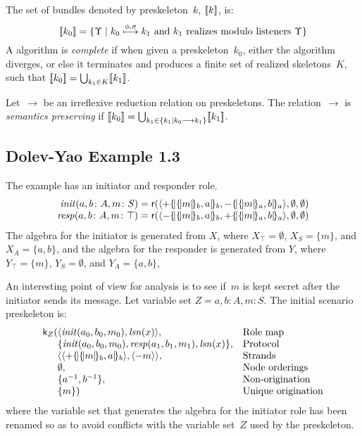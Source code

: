 \documentclass[12pt]{article}
\theoremstyle{definition}
\newcommand{\role}{\mathsf{r}}
\newcommand{\skel}{\mathsf{k}}
\newcommand{\lsn}{\fn{lsn}}
\newcommand{\init}{\fn{init}}
\newcommand{\resp}{\fn{resp}}
\begin{document}
The set of bundles denoted by preskeleton~$k$, $[\![k]\!]$, is:
$$[\![k_0]\!] = \{\Upsilon\mid
\mbox{$k_0\stackrel{\phi,\sigma}{\longmapsto}k_1$ and $k_1$ realizes modulo
  listeners $\Upsilon$}\}$$ A {\cpsa} algorithm is \emph{complete} if
when given a preskeleton~$k_0$, either the algorithm diverges, or else it
terminates and produces a finite set of realized skeletons~$K$, such
that $[\![k_0]\!]=\bigcup_{k_1\in K}[\![k_1]\!]$.

Let~$\longrightarrow$ be an irreflexive reduction relation on
preskeletons.  The relation~$\longrightarrow$ is \emph{semantics
  preserving} if $[\![k_0]\!]=\bigcup_{k_1\in\{k_1\mid
  k_0\longrightarrow k_1\}}[\![k_1]\!]$.

\subsection{Dolev-Yao Example 1.3}
The example has an initiator and responder role.
$$\begin{array}{r@{{}={}}l}
\init(a,b\colon A, m\colon S)&
\role(\seq{\outbnd\enc{\enc{m}{b},a}{b},\inbnd\enc{\enc{m}{a},b}{a}},
\emptyset,\emptyset)\\
\resp(a,b\colon A, m\colon\top)&
\role(\seq{\inbnd\enc{\enc{m}{b},a}{b},\outbnd\enc{\enc{m}{a},b}{a}},
\emptyset,\emptyset)\\
\end{array}$$
The algebra for the initiator is generated from $X$, where
$X_\top=\emptyset$, $X_S=\{m\}$, and $X_A=\{a,b\}$, and the algebra
for the responder is generated from $Y$, where $Y_\top=\{m\}$,
$Y_S=\emptyset$, and $Y_A=\{a,b\}$,

An interesting point of view for analysis is to see if~$m$ is kept
secret after the initiator sends its message.  Let variable set
$Z=a,b\colon A, m\colon S$.  The initial scenario preskeleton is:
$$\begin{array}{r@{}ll}
\skel_Z(
&\seq{\init(a_0,b_0,m_0),\lsn(x)},
&\mbox{Role map}\\
&\{\init(a_0,b_0,m_0),\resp(a_1,b_1,m_1),\lsn(x)\},
&\mbox{Protocol}\\
&\seq{\seq{\outbnd\enc{\enc{m}{b},a}{b}},\seq{\inbnd m}},
&\mbox{Strands}\\
&\emptyset,
&\mbox{Node orderings}\\
&\{a^{-1},b^{-1}\},
&\mbox{Non-origination}\\
&\{m\})
&\mbox{Unique origination}
\end{array}$$
where the variable set that generates the algebra for the initiator
role has been renamed so as to avoid conflicts with the variable set~$Z$
used by the preskeleton.
\end{document}
